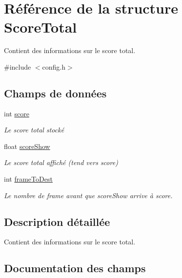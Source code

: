 \hypertarget{struct_score_total}{}\section{Référence de la structure Score\+Total}
\label{struct_score_total}


Contient des informations sur le score total.  




{\ttfamily \#include $<$config.\+h$>$}

\subsection*{Champs de données}
\begin{DoxyCompactItemize}
\item 
int \hyperlink{struct_score_total_a5f72868887f5434097710d75139abd69}{score}
\begin{DoxyCompactList}\small\item\em Le score total stocké \end{DoxyCompactList}\item 
float \hyperlink{struct_score_total_ab878dcb325c9c66be76d0eb080d63c39}{score\+Show}
\begin{DoxyCompactList}\small\item\em Le score total affiché (tend vers score) \end{DoxyCompactList}\item 
int \hyperlink{struct_score_total_a0cbbdcaadcfffeab6023212d3f17c063}{frame\+To\+Dest}
\begin{DoxyCompactList}\small\item\em Le nombre de frame avant que score\+Show arrive à score. \end{DoxyCompactList}\end{DoxyCompactItemize}


\subsection{Description détaillée}
Contient des informations sur le score total. 

\subsection{Documentation des champs}
\mbox{\label{struct_score_total_a0cbbdcaadcfffeab6023212d3f17c063}} 
